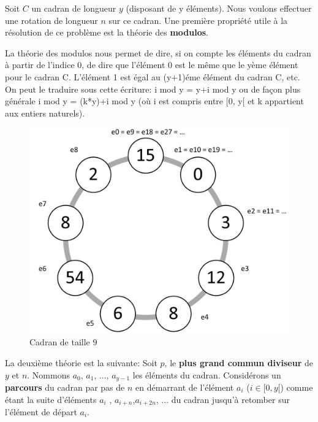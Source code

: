 \documentclass[a4paper, 12pt]{article}
\begin{document}
Soit $C$ un cadran de longueur $y$ (disposant de y éléments). Nous voulons effectuer une rotation de  longueur $n$ sur ce cadran. Une première propriété utile à la résolution de ce problème est la théorie des \textbf{modulos}. \newline

La théorie des modulos nous permet de dire, si on compte les éléments du cadran à partir de l'indice 0, de dire que l'élément 0 est le même que le yème élément pour le cadran C. L'élément 1 est égal au (y+1)éme élément du cadran C, etc. On peut le traduire sous cette écriture:\newline
i mod y = y+i mod y ou de façon plus générale \newline
i mod y = (k*y)+i mod y (où i est compris entre [0, y[ et k appartient aux entiers naturels). \newline

\begin{figure}[c|h]
	\includegraphics[scale=0.3]{cadran.jpg}
	\caption{Cadran de taille 9}
\end{figure}

La deuxième théorie est la suivante:\newline
Soit $p$, le \textbf{plus grand commun diviseur} de $y$ et $n$. Nommons $a_{0}$, $a_{1}$, ..., $a_{y-1}$ les éléments du cadran. Considérons un \textbf{parcours} du cadran par pas de $n$ en démarrant de l'élément $a_{i}$ ($i \in [0,y[$) comme étant la suite d'éléments $a_{i}$ , $a_{i+n}$,$a_{i+2n}$, ... du cadran jusqu'à retomber sur l'élément de départ $a_{i}$. \newline
\end{document}
